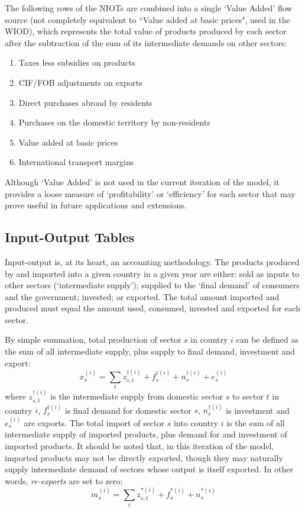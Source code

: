 \documentclass[a4paper]{article}
\begin{document}
The following rows of the NIOTs are combined into a single `Value Added' flow source (not completely equivalent to ``Value added at basic prices", used in the WIOD), which represents the total value of products produced by each sector after the subtraction of the sum of its intermediate demands on other sectors:
\begin{enumerate}[--]
\itemsep -0.4em 
\item Taxes less subsidies on products
\item CIF/FOB adjustments on exports
\item Direct purchases abroad by residents
\item Purchases on the domestic territory by non-residents
\item Value added at basic prices
\item International transport margins
\end{enumerate}
Although `Value Added' is not used in the current iteration of the model, it provides a loose measure of `profitability' or `efficiency' for each sector that may prove useful in future applications and extensions.

\subsection{Input-Output Tables} \label{sec:iots}
Input-output is, at its heart, an accounting methodology.
The products produced by and imported into a given country in a given year are either: sold as inputs to other sectors (`intermediate supply'); supplied to the `final demand' of consumers and the government; invested; or exported.
The total amount imported and produced must equal the amount used, consumed, invested and exported for each sector.

By simple summation, total production of sector $s$ in country $i$ can be defined as the sum of all intermediate supply, plus supply to final demand, investment and export:
\begin{equation}\label{eqn:x}
x_s^{(i)}=\sum\limits_{t}z_{s,t}^{\dagger(i)} + f_s^{\dagger(i)} + n_s^{\dagger(i)} + e_s^{(i)}
\end{equation}
where $z_{s,t}^{\dagger(i)}$ is the intermediate supply from domestic sector $s$ to sector $t$ in country $i$, $f_s^{\dagger(i)}$ is final demand for domestic sector $s$, $n_s^{\dagger(i)}$ is investment and $e_s^{(i)}$ are exports.
The total import of sector $s$ into country $i$ is the sum of all intermediate supply of imported products, plus demand for and investment of imported products. 
It should be noted that, in this iteration of the model, imported products may not be directly exported, though they may naturally supply intermediate demand of sectors whose output is itself exported.
In other words, \textit{re-exports} are set to zero:
\begin{equation}\label{eqn:m}
m_s^{(i)}=\sum\limits_{t}z_{s,t}^{*(i)} + f_s^{*(i)} + n_s^{*(i)}
\end{equation}
\end{document}
